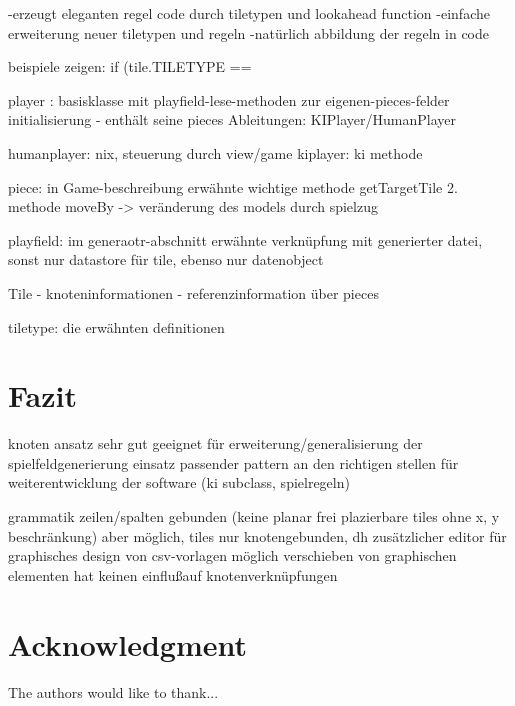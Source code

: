 \documentclass[conference]{IEEEtran}
\begin{document}
    -erzeugt eleganten regel code durch tiletypen und lookahead function
    -einfache erweiterung neuer tiletypen und regeln
    -nat\"urlich abbildung der regeln in code

    beispiele zeigen:
    if (tile.TILETYPE == 


player : basisklasse mit playfield-lese-methoden zur eigenen-pieces-felder initialisierung
      - enth\"alt seine pieces
      Ableitungen: KIPlayer/HumanPlayer

humanplayer: nix, steuerung durch view/game
kiplayer: ki methode

piece: in Game-beschreibung erwähnte wichtige methode getTargetTile
2. methode moveBy -> veränderung des models durch spielzug

playfield: im generaotr-abschnitt erwähnte verknüpfung mit generierter datei, sonst nur datastore für tile, ebenso nur datenobject

Tile 
  - knoteninformationen
  - referenzinformation \"uber pieces


tiletype: die erwähnten definitionen

\section{Fazit}

knoten ansatz sehr gut geeignet f\"ur erweiterung/generalisierung der spielfeldgenerierung
einsatz passender pattern an den richtigen stellen f\"ur weiterentwicklung der software
(ki subclass, spielregeln)

grammatik zeilen/spalten gebunden (keine planar frei plazierbare tiles ohne x, y beschr\"ankung)
aber m\"oglich, tiles nur knotengebunden, dh
zus\"atzlicher editor f\"ur graphisches design von csv-vorlagen m\"oglich
verschieben von graphischen elementen hat keinen einflu\ss  auf knotenverkn\"upfungen



\section*{Acknowledgment}


The authors would like to thank...






\end{document}
